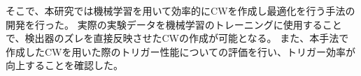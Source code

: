 そこで、本研究では機械学習を用いて効率的にCWを作成し最適化を行う手法の開発を行った。
実際の実験データを機械学習のトレーニングに使用することで、検出器のズレを直接反映させたCWの作成が可能となる。
また、本手法で作成したCWを用いた際のトリガー性能についての評価を行い、トリガー効率が向上することを確認した。






